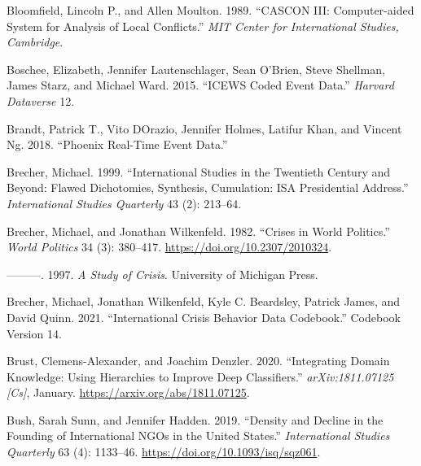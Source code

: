 \documentclass{article}
\newlength{\cslhangindent}
\newlength{\cslentryspacingunit} %
\newenvironment{CSLReferences}[2] %
 {%
  \setlength{\parindent}{0pt}
  \ifodd #1
  \let\oldpar\par
  \def\par{\hangindent=\cslhangindent\oldpar}
  \fi
  \setlength{\parskip}{#2\cslentryspacingunit}
 }%
 {}
\begin{document}
\begin{CSLReferences}{1}{0}
\leavevmode{}%
Bloomfield, Lincoln P., and Allen Moulton. 1989. {``{CASCON III}:
{Computer-aided} System for Analysis of Local Conflicts.''} \emph{MIT
Center for International Studies, Cambridge}.

\leavevmode{}%
Boschee, Elizabeth, Jennifer Lautenschlager, Sean O'Brien, Steve
Shellman, James Starz, and Michael Ward. 2015. {``{ICEWS} Coded Event
Data.''} \emph{Harvard Dataverse} 12.

\leavevmode{}%
Brandt, Patrick T., Vito DOrazio, Jennifer Holmes, Latifur Khan, and
Vincent Ng. 2018. {``Phoenix {Real-Time Event Data}.''}

\leavevmode{}%
Brecher, Michael. 1999. {``International Studies in the Twentieth
Century and Beyond: {Flawed} Dichotomies, Synthesis, Cumulation: {ISA}
Presidential Address.''} \emph{International Studies Quarterly} 43 (2):
213--64.

\leavevmode{}%
Brecher, Michael, and Jonathan Wilkenfeld. 1982. {``Crises in {World
Politics}.''} \emph{World Politics} 34 (3): 380--417.
\url{https://doi.org/10.2307/2010324}.

\leavevmode{}%
---------. 1997. \emph{A {Study} of {Crisis}}. {University of Michigan
Press}.

\leavevmode{}%
Brecher, Michael, Jonathan Wilkenfeld, Kyle C. Beardsley, Patrick James,
and David Quinn. 2021. {``International {Crisis Behavior Data
Codebook}.''} Codebook Version 14.

\leavevmode{}%
Brust, Clemens-Alexander, and Joachim Denzler. 2020. {``Integrating
Domain Knowledge: Using Hierarchies to Improve Deep Classifiers.''}
\emph{arXiv:1811.07125 {[}Cs{]}}, January.
\url{https://arxiv.org/abs/1811.07125}.

\leavevmode{}%
Bush, Sarah Sunn, and Jennifer Hadden. 2019. {``Density and {Decline} in
the {Founding} of {International NGOs} in the {United States}.''}
\emph{International Studies Quarterly} 63 (4): 1133--46.
\url{https://doi.org/10.1093/isq/sqz061}.


\end{CSLReferences}
\end{document}
